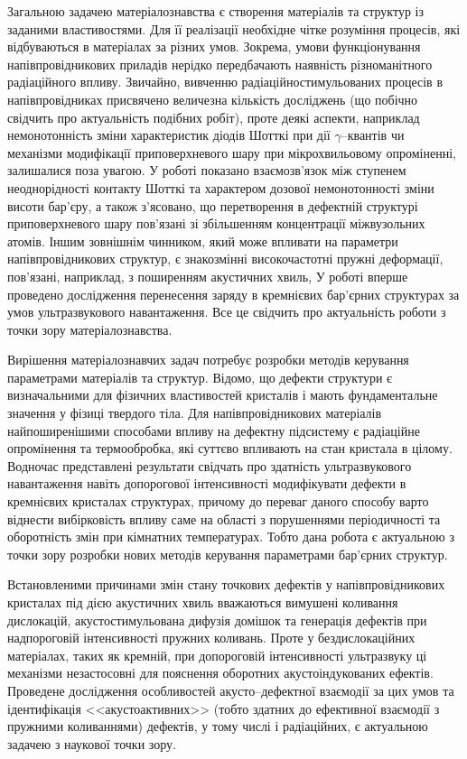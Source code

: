 Загальною задачею матеріалознавства є створення матеріалів та структур із заданими властивостями.
Для її реалізації необхідне чітке розуміння процесів, які відбуваються в матеріалах за різних умов.
Зокрема, умови функціонування напівпровідникових приладів нерідко передбачають наявність різноманітного радіаційного впливу.
Звичайно, вивченню радіаційностимульованих процесів в напівпровідниках присвячено величезна кількість досліджень (що побічно свідчить про актуальність подібних робіт),
проте деякі аспекти, наприклад немонотонність зміни характеристик діодів Шотткі при дії $\gamma$--квантів чи механізми модифікації приповерхневого шару при мікрохвильовому опроміненні, залишалися поза увагою.
У роботі показано взаємозв'язок між ступенем неоднорідності контакту Шотткі та характером дозової немонотонності зміни висоти бар'єру, а також з'ясовано, що перетворення в дефектній структурі приповерхневого шару пов'язані зі збільшенням концентрації міжвузольних атомів.
Іншим зовнішнім чинником, який може впливати на параметри напівпровідникових структур, є знакозмінні високочастотні пружні деформації, пов'язані, наприклад, з поширенням акустичних хвиль,
У роботі вперше проведено дослідження перенесення заряду в кремнієвих бар'єрних структурах за умов ультразвукового навантаження.
Все це свідчить про актуальність роботи з точки зору матеріалознавства.


Вирішення матеріалознавчих задач потребує розробки методів керування параметрами матеріалів та структур.
Відомо, що дефекти структури є визначальними для фізичних властивостей кристалів і мають фундаментальне значення у фізиці твердого тіла.
Для напівпровідникових матеріалів найпоширенішими способами впливу на дефектну підсистему є радіаційне опромінення та термообробка, які суттєво впливають на стан кристала в цілому.
Водночас представлені результати свідчать про здатність ультразвукового навантаження навіть допорогової інтенсивності модифікувати дефекти в кремнієвих кристалах структурах, причому до переваг даного способу варто віднести вибірковість впливу саме на області з порушеннями періодичності та оборотність змін при кімнатних температурах.
Тобто дана робота є актуальною з точки зору розробки нових методів керування параметрами бар'єрних структур.

Встановленими  причинами змін стану точкових дефектів у напівпровідникових кристалах під дією акустичних хвиль вважаються вимушені коливання дислокацій, акустостимульована дифузія домішок та генерація дефектів при надпороговій інтенсивності пружних коливань.
Проте у бездислокаційних матеріалах, таких як кремній, при допороговій інтенсивності ультразвуку ці механізми  незастосовні для пояснення оборотних акустоіндукованих ефектів.
Проведене дослідження особливостей акусто--дефектної взаємодії за цих умов та ідентифікація <<акустоактивних>> (тобто здатних до ефективної взаємодії з пружними коливаннями) дефектів, у тому числі і радіаційних, є актуальною задачею з наукової точки зору.

